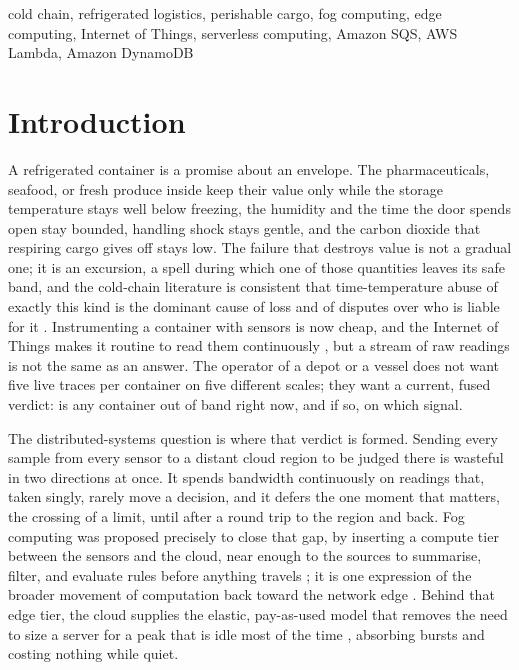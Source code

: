 \documentclass[conference]{IEEEtran}
\begin{document}
\begin{IEEEkeywords}
cold chain, refrigerated logistics, perishable cargo, fog computing, edge computing, Internet of Things, serverless computing, Amazon SQS, AWS Lambda, Amazon DynamoDB
\end{IEEEkeywords}

\section{Introduction}

A refrigerated container is a promise about an envelope. The pharmaceuticals, seafood, or fresh produce inside keep their value only while the storage temperature stays well below freezing, the humidity and the time the door spends open stay bounded, handling shock stays gentle, and the carbon dioxide that respiring cargo gives off stays low. The failure that destroys value is not a gradual one; it is an excursion, a spell during which one of those quantities leaves its safe band, and the cold-chain literature is consistent that time-temperature abuse of exactly this kind is the dominant cause of loss and of disputes over who is liable for it \cite{ndraha2018, aung2014}. Instrumenting a container with sensors is now cheap, and the Internet of Things makes it routine to read them continuously \cite{atzori2010}, but a stream of raw readings is not the same as an answer. The operator of a depot or a vessel does not want five live traces per container on five different scales; they want a current, fused verdict: is any container out of band right now, and if so, on which signal.

The distributed-systems question is where that verdict is formed. Sending every sample from every sensor to a distant cloud region to be judged there is wasteful in two directions at once. It spends bandwidth continuously on readings that, taken singly, rarely move a decision, and it defers the one moment that matters, the crossing of a limit, until after a round trip to the region and back. Fog computing was proposed precisely to close that gap, by inserting a compute tier between the sensors and the cloud, near enough to the sources to summarise, filter, and evaluate rules before anything travels \cite{bonomi2012, yousefpour2019}; it is one expression of the broader movement of computation back toward the network edge \cite{shi2016, satyanarayanan2017}. Behind that edge tier, the cloud supplies the elastic, pay-as-used model that removes the need to size a server for a peak that is idle most of the time \cite{armbrust2010}, absorbing bursts and costing nothing while quiet.
\end{document}

